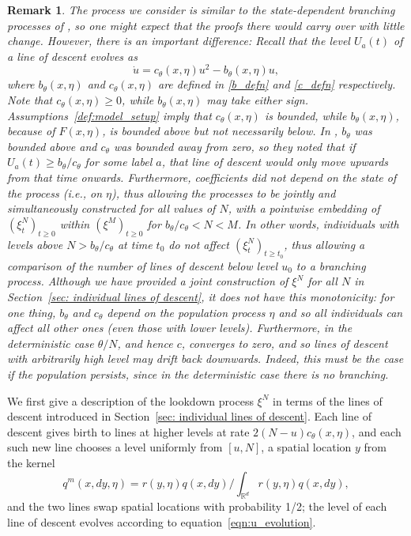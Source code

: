 \documentclass[12pt]{article}
\newtheorem{remark}[theorem]{Remark}
\newcommand{\IR}{\mathbb R}
\newcommand{\lp}{\xi}              %
\numberwithin{equation}{section}
\begin{document}
\begin{remark}
The process we consider is similar to the state-dependent branching processes
of \citet{kurtz/rodrigues:2011}, so one might expect that the proofs there would carry over with little change.
However, there is an important difference:
Recall that the level $U_a(t)$ of a line of descent evolves as
\begin{equation} \label{eqn:u_evolution}
\dot u = c_\theta(x, \eta) u^2 - b_\theta(x, \eta) u,
\end{equation}
where $b_\theta(x, \eta)$ and $c_\theta(x, \eta)$ are defined in \eqref{b_defn}
and \eqref{c_defn} respectively.
Note that $c_\theta(x, \eta) \ge 0$, while $b_\theta(x, \eta)$ may take either sign.
Assumptions~\ref{def:model_setup} imply that $c_\theta(x, \eta)$ is bounded,
while $b_\theta(x, \eta)$, because of $F(x, \eta)$, is bounded above but not necessarily below.
In \citet{kurtz/rodrigues:2011}, $b_\theta$ was bounded above and $c_\theta$ was bounded away from zero,
so they noted that if $U_a(t) \ge b_\theta/c_\theta$ for some label $a$,
that line of descent would only move upwards from that time onwards.
Furthermore, coefficients did not depend on the state of the process (i.e., on $\eta$),
thus allowing the processes to be jointly and simultaneously constructed
for all values of $N$, with a pointwise embedding
of $(\lp^N_t)_{t \ge 0}$ within $(\lp^{M})_{t \ge 0}$ for $b_\theta/c_\theta < N < M$.
In other words, individuals with levels above $N > b_\theta/c_\theta$ at time $t_0$
do not affect $(\lp^N_t)_{t \ge t_0}$,
thus allowing a comparison of the number of lines of descent below level $u_0$
to a branching process.
Although we have provided a
joint construction of $\lp^N$ for all $N$ in Section~\ref{sec: individual lines of descent},
it does not have this monotonicity:
for one thing, $b_\theta$ and $c_\theta$ depend on the population process $\eta$
and so all individuals can affect all other ones (even those with lower levels).
Furthermore, in the deterministic case $\theta/N$, and hence $c$, converges to zero,
and so lines of descent with arbitrarily high level may drift back downwards.
Indeed, this must be the case if the population persists,
since in the deterministic case there is no branching.
\end{remark}

We first give a description of the lookdown process $\lp^N$ in terms of the lines of descent
introduced in Section~\ref{sec: individual lines of descent}.
Each line of descent
gives birth to lines at higher levels at rate $2 (N - u) c_\theta(x, \eta)$,
and each such new line chooses a level uniformly from $[u, N]$,
a spatial location $y$ from the kernel
\begin{equation} \label{eqn:qm_defn}
    q^m(x, dy, \eta)
    =
    r(y, \eta) q(x, dy) / \int_{\IR^d} r(y, \eta) q(x, dy),
\end{equation}
and the two lines swap spatial locations with probability 1/2;
the level of each line of descent evolves according to equation~\eqref{eqn:u_evolution}.
\end{document}
